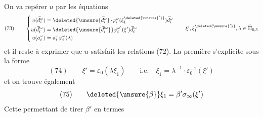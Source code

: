 On va repérer $u$ par les équations
\[
(73)\qquad\left\{\begin{aligned}
u(\widetilde d_i^\omega)&=\deleted{\unsure{\widetilde d_i^\omega}}\varphi_i^\omega(\xi_1^{\deleted{\unsure{'}}})\widetilde d_i^\omega\\
u(\widetilde d_i^{\prime\omega})&=\deleted{\unsure{\widetilde d_i^{\prime\omega}}}\varphi_i^{\omega'}(\xi')\widetilde d_i^{\prime\omega}\\
u(a_i^\omega)&=a_i^\omega\varphi_i^\omega(\lambda)
\end{aligned}\right.\qquad \xi',\xi_1^{\deleted{\unsure{'}}},\lambda\in\widehat\Pi_{0,3}
\]
et il reste à exprimer que $u$ satisfait les relations (72). La première s'explicite sous la forme
\[
(74)\qquad\xi'=\varepsilon_0(\lambda\xi_1)\qquad\text{i.e.}\quad\xi_1=\lambda^{-1}\cdot\varepsilon_0^{-1}(\xi')
\]
et on trouve également
\[
(75)\qquad\deleted{\unsure{\beta}}\xi_1=\beta'\sigma_\infty(\xi')
\]
Cette  permettant de tirer $\beta'$ en termes
